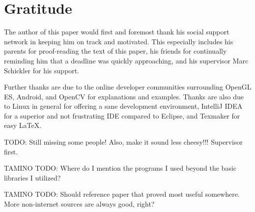 \section*{Gratitude}

The author of this paper would first and foremost thank his social support network in keeping him on track and motivated.
This especially includes his parents for proof-reading the text of this paper, his friends for continually reminding him that a deadline was quickly approaching, and his supervisor Marc Schickler for his support.

Further thanks are due to the online developer communities surrounding OpenGL ES, Android, and OpenCV for explanations and examples.
Thanks are also due to Linux in general for offering a sane development environment, IntelliJ IDEA for a superior and not frustrating IDE compared to Eclipse, and Texmaker for easy \LaTeX .

TODO: Still missing some people! Also, make it sound less cheesy!!! Supervisor first.

TAMINO TODO: Where do I mention the programs I used beyond the basic libraries I utilized?

TAMINO TODO: Should reference paper that proved most useful somewhere. More non-internet sources are always good, right?
